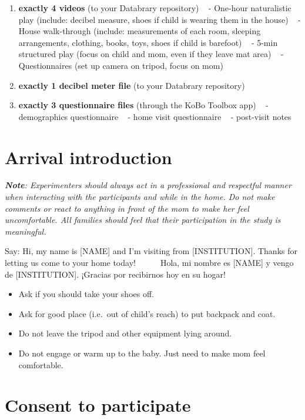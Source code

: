 \documentclass[
  12pt,
]{book}
\providecommand{\tightlist}{%
  \setlength{\itemsep}{0pt}\setlength{\parskip}{0pt}}
\begin{document}
\begin{enumerate}
\def\labelenumi{\arabic{enumi}.}
\tightlist
\item
  \textbf{exactly 4 videos} (to your Databrary repository)
  ~ - One-hour naturalistic play (include: decibel measure, shoes if child is wearing them in the house)
  ~ - House walk-through (include: measurements of each room, sleeping arrangements, clothing, books, toys, shoes if child is barefoot)
  ~ - 5-min structured play (focus on child and mom, even if they leave mat area)
  ~ - Questionnaires (set up camera on tripod, focus on mom)
\item
  \textbf{exactly 1 decibel meter file} (to your Databrary repository)
\item
  \textbf{exactly 3 questionnaire files} (through the KoBo Toolbox app)
  ~ - demographics questionnaire
  ~ - home visit questionnaire
  ~ - post-visit notes
\end{enumerate}

\hypertarget{arrival-introduction}{%
\section{Arrival introduction}\label{arrival-introduction}}

\emph{\textbf{Note}: Experimenters should always act in a professional and respectful manner when interacting with the participants and while in the home. Do not make comments or react to anything in front of the mom to make her feel uncomfortable. All families should feel that their participation in the study is meaningful.}

Say: Hi, my name is {[}NAME{]} and I'm visiting from {[}INSTITUTION{]}. Thanks for letting us come to your home today!
    Hola, mi nombre es {[}NAME{]} y vengo de {[}INSTITUTION{]}. ¡Gracias por recibirnos hoy en su hogar!

\begin{itemize}
\tightlist
\item
  Ask if you should take your shoes off.
\item
  Ask for good place (i.e.~out of child's reach) to put backpack and coat.
\item
  Do not leave the tripod and other equipment lying around.
\item
  Do not engage or warm up to the baby. Just need to make mom feel comfortable.
\end{itemize}

\hypertarget{consent-to-participate}{%
\section{Consent to participate}\label{consent-to-participate}}
\end{document}
